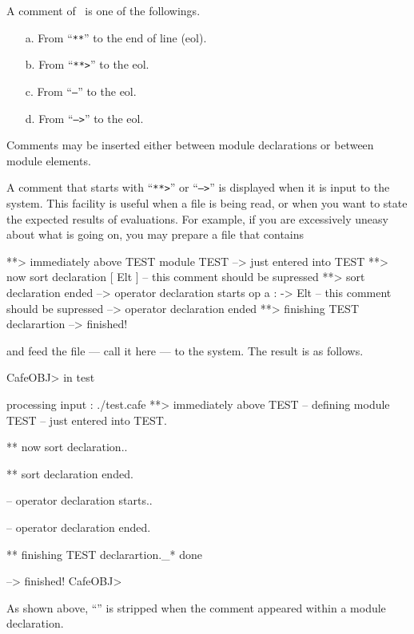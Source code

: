 \documentclass[a4paper]{memoir}
\begin{document}
A comment of \cafeobj~is one of the followings.
\begin{itemize}
\item[a.] From ``\texttt{**}'' to the end of line (eol).\index{\texttt{**}}
\item[b.] From ``\texttt{**>}'' to the eol.\index{\texttt{**>}}
\item[c.] From ``\texttt{--}'' to the eol.\index{\texttt{--}}
\item[d.] From ``\texttt{-->}'' to the eol.\index{\texttt{-->}}
\end{itemize}
Comments may be inserted either between module declarations or
between module elements.

A comment that starts with ``\texttt{**>}'' or ``\texttt{-->}''
is displayed when it is input to the
system. This facility is useful when a file is being read, or when
you want to state the expected results of evaluations. For example,
if you are excessively uneasy about what is going on, you may prepare
a file that contains
\begin{vvtm}
\begin{ccode}
**> immediately above TEST
module TEST {
--> just entered into TEST
**> now sort declaration
[ Elt ] -- this comment should be supressed
**> sort declaration ended
--> operator declaration starts
op a : -> Elt -- this comment should be supressed
--> operator declaration ended
**> finishing TEST declarartion
}
--> finished!
\end{ccode}
\end{vvtm}
and feed the file --- call it  here --- to the system.
The result is as follows.
\begin{vvtm}
\begin{ccode}
  CafeOBJ> in test

  processing input : ./test.cafe
  **> immediately above TEST
  -- defining module TEST
  -- just entered into TEST.

  ** now sort declaration..

  ** sort declaration ended.

  -- operator declaration starts..

  -- operator declaration ended.

  ** finishing TEST declarartion._* done

  --> finished!
  CafeOBJ>
\end{ccode}
\end{vvtm}
As shown above, ``\kbd{>}'' is stripped when the comment appeared within
a module declaration.
\end{document}
